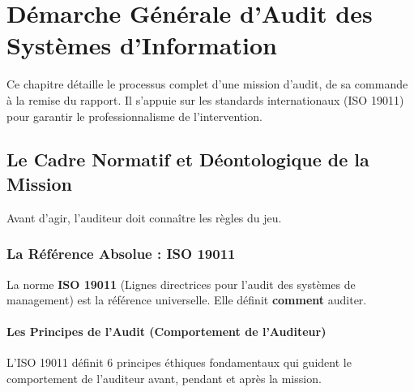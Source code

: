 
\chapter{Démarche Générale d'Audit des Systèmes d'Information}\label{chap:03_demarche}

Ce chapitre détaille le processus complet d'une mission d'audit, de sa commande à la remise du rapport. Il s'appuie sur les standards internationaux (ISO 19011) pour garantir le professionnalisme de l'intervention.

\section{Le Cadre Normatif et Déontologique de la Mission}

Avant d'agir, l'auditeur doit connaître les règles du jeu.

\subsection{La Référence Absolue : ISO 19011}

La norme \textbf{ISO 19011} (Lignes directrices pour l'audit des systèmes de management) est la référence universelle. Elle définit \textbf{comment} auditer.

\subsubsection{Les Principes de l'Audit (Comportement de l'Auditeur)}

L'ISO 19011 définit 6 principes éthiques fondamentaux qui guident le comportement de l'auditeur avant, pendant et après la mission.


